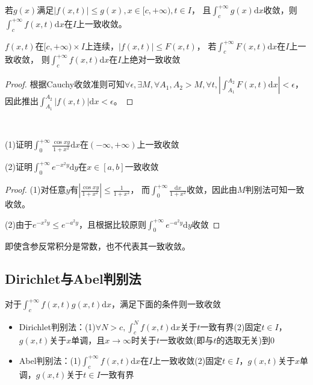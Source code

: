\begin{theorem}[M判别法]
  若$g(x)$满足$|f(x,t)| \leq g(x), x \in [c,+\infty), t \in I$，
  且$\int_c^{+\infty}g(x)\mathrm{d}x$收敛，则
  $\int_c^{+\infty}f(x,t)\mathrm{d}x$在$I$上一致收敛。
\end{theorem}

\begin{theorem}[比较判别法]
  $f(x,t)$在$[c,+\infty) \times I$上连续，$|f(x,t)| \leq F(x,t)$，
  若$\int_c^{+\infty}F(x,t)\mathrm{d}x$在$I$上一致收敛，
  则$\int_c^{+\infty}f(x,t)\mathrm{d}x$在$I$上绝对一致收敛
\end{theorem}

\begin{proof}
  根据Cauchy收敛准则可知$\forall \epsilon, \exists M, \forall A_1,A_2 > M, \forall t, |\int_{A_1}^{A_2}F(x,t)\mathrm{d}x| < \epsilon$，
  因此推出$\int_{A_1}^{A_2}|f(x,t)| \mathrm{d}x < \epsilon$。
\end{proof}

~

\begin{exercise}[M判别法]
  (1)证明$\int_0^{+\infty} \frac{\cos xy}{1 + x^2}\mathrm{d} x$在$(-\infty,+\infty)$上一致收敛
  
  (2)证明$\int_0^{+\infty}e^{-x^2y}\mathrm{d}y$在$x \in [a,b]$一致收敛
\end{exercise}

\begin{proof}
  (1)对任意$y$有$\left| \frac{\cos xy}{1 + x^2} \right| \leq \frac{1}{1+x^2}$，
  而$\int_0^{+\infty} \frac{\mathrm{d} x}{1 + x^2}$收敛，因此由$M$判别法可知一致收敛。
  
  (2)由于$e^{-x^2y} \leq e^{-a^2y}$，且根据比较原则$\int_0^{+\infty}e^{-a^2y}\mathrm{d}y$收敛
\end{proof}

\begin{note}
  即使含参反常积分是常数，也不代表其一致收敛。
\end{note}

\subsection{Dirichlet与Abel判别法}

\begin{theorem}[Dirichlet与Abel判别法]
  对于$\int_c^{+\infty}f(x,t)g(x,t)\mathrm{d}x$，满足下面的条件则一致收敛
  \begin{itemize}
  \item Dirichlet判别法：(1)$\forall N > c, \int_c^N f(x,t)\mathrm{d}x$关于$t$一致有界(2)固定$t \in I$，$g(x,t)$关于$x$单调，且$x \rightarrow \infty$时关于$t$一致收敛(即与$t$的选取无关)到$0$
  \item Abel判别法：(1)$\int_c^{+\infty} f(x,t)\mathrm{d}x$在$I$上一致收敛(2)固定$t \in I$，$g(x,t)$关于$x$单调，$g(x,t)$关于$t \in I$一致有界
  \end{itemize}
\end{theorem}

